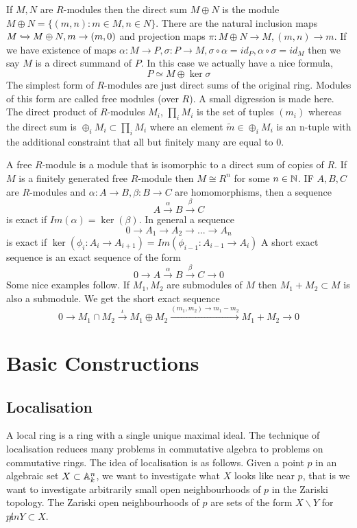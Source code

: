 If $M,N$ are $R$-modules then the direct sum $M \oplus N$ is the module $M\oplus N = \{(m,n): m\in M, n\in N\}$. There are the natural inclusion maps $M \xhookrightarrow{} M \oplus N, m \to (m,0)$ and projection maps $\pi: M\oplus N \to M, (m,n)\to m$. If we have existence of maps $\alpha: M\to P, \sigma: P\to M, \sigma\circ\alpha = {id}_P, \alpha\circ\sigma = {id}_M $ then we say $M$ is a direct summand of $P$. In this case we actually have a nice formula,
\[P \simeq M \oplus \ker \sigma \]
The simplest form of $R$-modules are just direct sums of the original ring. Modules of this form are called free modules (over $R$). A small digression is made here. The direct product of $R$-modules $M_i$, $\prod_i M_i$ is the set of tuples $(m_i)$ whereas the direct sum is $\oplus_i M_i \subset \prod_i M_i$ where an element $\tilde{m} \in \oplus_i M_i$ is an n-tuple with the additional constraint that all but finitely many are equal to $0$. 

A free $R$-module is a module that is isomorphic to a direct sum of copies of $R$. If $M$ is a finitely generated free $R$-module then $M \cong R^n$ for some $n\in \mathbb{N}$. IF $A,B,C$ are $R$-modules and $\alpha : A\to B, \beta:B\to C$ are homomorphisms, then a sequence 
\[A\stackrel{\alpha}{\to} B \stackrel{\beta}{\to} C\]
is exact if $Im(\alpha) = \ker(\beta)$. In general a sequence
\[0\to A_1 \to A_2 \to ... \to A_n\]
is exact if $\ker(\phi_i: A_i\to A_{i+1}) = Im(\phi_{i-1}: A_{i - 1}\to A_i)$
A short exact sequence is an exact sequence of the form 
\[0\to A\stackrel{\alpha}{\to} B \stackrel{\beta}{\to} C\to 0\]
Some nice examples follow. If $M_1, M_2$ are submodules of $M$ then $M_1 + M_2 \subset M$ is also a submodule. We get the short exact sequence
\[0\to M_1\cap M_2 \stackrel{\iota}{\to} M_1\oplus M_2 \stackrel{(m_1,m_2)\to m_1 - m_2}{\to} M_1 + M_2 \to 0\]
\section{Basic Constructions}
\subsection{Localisation}
A local ring is a ring with a single unique maximal ideal. The technique of localisation reduces many problems in commutative algebra to problems on commutative rings. The idea of localisation is as follows. Given a point $p$ in an algebraic set $X \subset \mathbb{A}^n_k$, we want to investigate what $X$ looks like near $p$, that is we want to investigate arbitrarily small open neighbourhoods of $p$ in the Zariski topology. The Zariski open neighbourhoods of $p$ are sets of the form $X\backslash Y$ for $p\not in Y \subset X$. 

